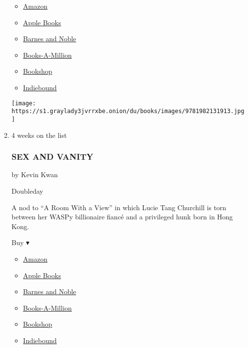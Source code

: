 \begin{enumerate}
  \begin{itemize}
  \tightlist
  \item
    \href{https://www.amazon.com/dp/1982131896?tag=NYTBSREV-20\&tag=NYTBS-20}{Amazon}
  \item
    \href{https://du-gae-books-dot-nyt-du-prd.appspot.com/buy?title=THE+BOOK+OF+LOST+NAMES\&author=Kristin+Harmel}{Apple
    Books}
  \item
    \href{https://www.anrdoezrs.net/click-7990613-11819508?url=https\%3A\%2F\%2Fwww.barnesandnoble.com\%2Fw\%2F\%3Fean\%3D9781982131913}{Barnes
    and Noble}
  \item
    \href{https://www.anrdoezrs.net/click-7990613-35140?url=https\%3A\%2F\%2Fwww.booksamillion.com\%2Fp\%2FTHE\%2BBOOK\%2BOF\%2BLOST\%2BNAMES\%2FKristin\%2BHarmel\%2F9781982131913}{Books-A-Million}
  \item
    \href{https://bookshop.org/a/3546/9781982131913}{Bookshop}
  \item
    \href{https://www.indiebound.org/book/9781982131913?aff=NYT}{Indiebound}
  \end{itemize}

  \texttt{[image: https://s1.graylady3jvrrxbe.onion/du/books/images/9781982131913.jpg]}
\item
  4 weeks on the list

  \hypertarget{sex-and-vanity}{%
  \subsubsection{SEX AND VANITY}\label{sex-and-vanity}}

  by Kevin Kwan

  Doubleday

  A nod to ``A Room With a View'' in which Lucie Tang Churchill is torn
  between her WASPy billionaire fiancé and a privileged hunk born in
  Hong Kong.

  Buy ▾

  \begin{itemize}
  \tightlist
  \item
    \href{https://www.amazon.com/dp/0385546270?tag=NYTBSREV-20\&tag=NYTBS-20}{Amazon}
  \item
    \href{https://du-gae-books-dot-nyt-du-prd.appspot.com/buy?title=SEX+AND+VANITY\&author=Kevin+Kwan}{Apple
    Books}
  \item
    \href{https://www.anrdoezrs.net/click-7990613-11819508?url=https\%3A\%2F\%2Fwww.barnesandnoble.com\%2Fw\%2F\%3Fean\%3D9780385546270}{Barnes
    and Noble}
  \item
    \href{https://www.anrdoezrs.net/click-7990613-35140?url=https\%3A\%2F\%2Fwww.booksamillion.com\%2Fp\%2FSEX\%2BAND\%2BVANITY\%2FKevin\%2BKwan\%2F9780385546270}{Books-A-Million}
  \item
    \href{https://bookshop.org/a/3546/9780385546270}{Bookshop}
  \item
    \href{https://www.indiebound.org/book/9780385546270?aff=NYT}{Indiebound}
  \end{itemize}


\end{enumerate}
